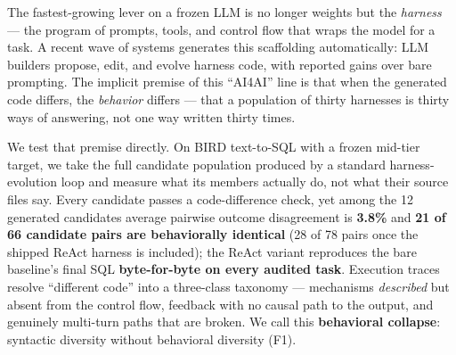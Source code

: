 The fastest-growing lever on a frozen LLM is no longer weights but the
\emph{harness} --- the program of prompts, tools, and control flow that
wraps the model for a task. A recent wave of systems generates this
scaffolding automatically: LLM builders propose, edit, and evolve
harness code, with reported gains over bare prompting. The implicit
premise of this ``AI4AI'' line is that when the generated code differs,
the \emph{behavior} differs --- that a population of thirty harnesses is
thirty ways of answering, not one way written thirty times.

We test that premise directly. On BIRD text-to-SQL with a frozen
mid-tier target, we take the full candidate population produced by a
standard harness-evolution loop and measure what its members actually
do, not what their source files say. Every candidate passes a
code-difference check, yet among the 12 generated candidates average
pairwise outcome disagreement is \textbf{3.8\%} and \textbf{21 of 66
candidate pairs are behaviorally identical} (28 of 78 pairs once the
shipped ReAct harness is included); the ReAct variant reproduces the
bare baseline's final SQL \textbf{byte-for-byte on every audited task}.
Execution traces resolve ``different code'' into a three-class taxonomy
--- mechanisms \emph{described} but absent from the control flow,
feedback with no causal path to the output, and genuinely multi-turn
paths that are broken. We call this \textbf{behavioral collapse}:
syntactic diversity without behavioral diversity (F1).
